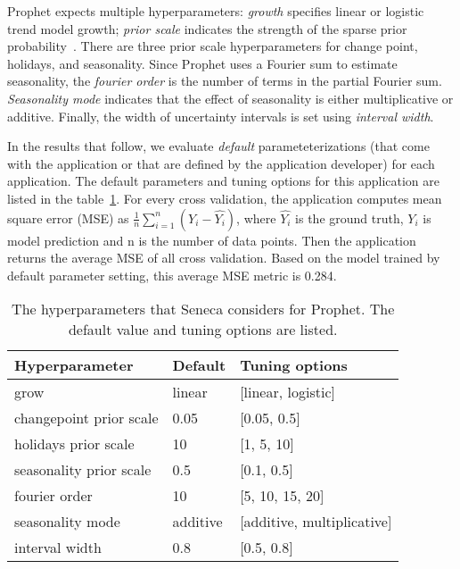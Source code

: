 Prophet expects multiple hyperparameters: \textit{growth} specifies linear or logistic trend model growth; \textit{prior scale} indicates the strength of the 
sparse prior probability~\cite{ref:sparse_prior}. 
There are three prior scale hyperparameters for change point, holidays, and seasonality. 
Since Prophet uses a Fourier sum to estimate seasonality, 
the \textit{fourier order} is the number of terms in the partial Fourier 
sum. \textit{Seasonality mode} indicates that the effect of seasonality is either 
multiplicative or additive. Finally, the width of uncertainty intervals 
is set using \textit{interval width}.

In the results that follow, we evaluate \textit{default} parameteterizations (that come with 
the application or that are defined by the application developer) for each application.  
The default parameters and tuning options for this application are listed in the table~\ref{tab:prophet_para}. For every cross validation, the application computes mean square error (MSE) as $\frac{1}{n}\sum_{i=1}^{n}(Y_i - \hat{Y_i})$, where $\hat{Y_i}$ is the ground truth, $Y_i$ is model prediction and n is the number of data points. Then the application returns the average MSE of all cross validation. Based on the model trained by default parameter setting, this average MSE metric is 0.284.

\begin{table}[t]
\centering
\begin{tabular}{|l|l|l|} 
\hline
\textbf{Hyperparameter}& \textbf{Default} & \textbf{Tuning options}\\
\hline
grow & linear & [linear, logistic] \\
\hline
changepoint prior scale & 0.05 & [0.05, 0.5] \\
\hline
holidays prior scale & 10 & [1, 5, 10] \\
\hline
seasonality prior scale & 0.5 & [0.1, 0.5] \\
\hline
fourier order & 10 & [5, 10, 15, 20] \\
\hline
seasonality mode & additive & [additive, multiplicative] \\
\hline
interval width & 0.8 & [0.5, 0.8] \\
\hline
\end{tabular}
\caption{The hyperparameters that Seneca considers for Prophet. 
The default value and tuning options are listed. 
\label{tab:prophet_para}}
\end{table}

